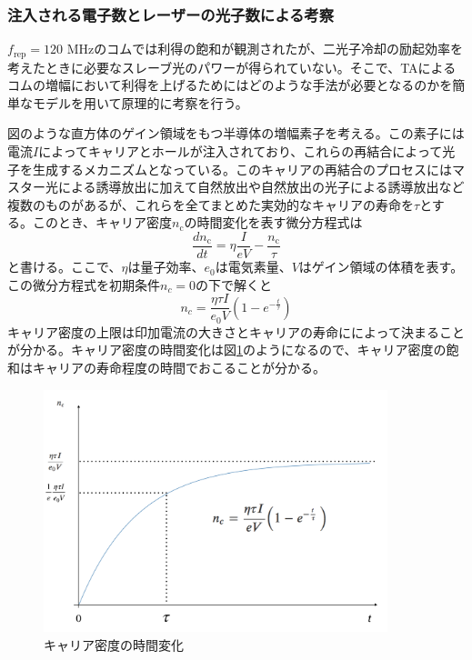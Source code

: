 \documentclass[uplatex, dvipdfmx, a4paper, report, papersize, 11pt]{jsbook}
\begin{document}
\subsubsection{注入される電子数とレーザーの光子数による考察}
$f_{\mathrm{rep}} = 120$ MHzのコムでは利得の飽和が観測されたが、二光子冷却の励起効率を考えたときに必要なスレーブ光のパワーが得られていない。そこで、TAによるコムの増幅において利得を上げるためにはどのような手法が必要となるのかを簡単なモデルを用いて原理的に考察を行う。\par
図のような直方体のゲイン領域をもつ半導体の増幅素子を考える。この素子には電流$I$によってキャリアとホールが注入されており、これらの再結合によって光子を生成するメカニズムとなっている。このキャリアの再結合のプロセスにはマスター光による誘導放出に加えて自然放出や自然放出の光子による誘導放出など複数のものがあるが、これらを全てまとめた実効的なキャリアの寿命を$\tau$とする。このとき、キャリア密度$n_{\mathrm{c}}$の時間変化を表す微分方程式は
\begin{equation}
  \frac{dn_{\mathrm{c}}}{dt} = \eta \frac{I}{eV}-\frac{n_{\mathrm{c}}}{\tau}
\end{equation}
と書ける。ここで、$\eta$は量子効率、$e_0$は電気素量、$V$はゲイン領域の体積を表す。この微分方程式を初期条件$n_c = 0$の下で解くと
\begin{equation}
  n_c = \frac{\eta\tau I}{e_0V}\left(1-e^{-\frac{t}{\tau}}\right)
\end{equation}
キャリア密度の上限は印加電流の大きさとキャリアの寿命にによって決まることが分かる。キャリア密度の時間変化は図\ref{carrier_saturation}のようになるので、キャリア密度の飽和はキャリアの寿命程度の時間でおこることが分かる。\\
\begin{figure}[H]
 \begin{center}
  \includegraphics[width=100mm]{figures/chapter4/carrier_saturation.png}
\end{center}
 \caption{キャリア密度の時間変化}
 \label{carrier_saturation}
\end{figure}
\end{document}

